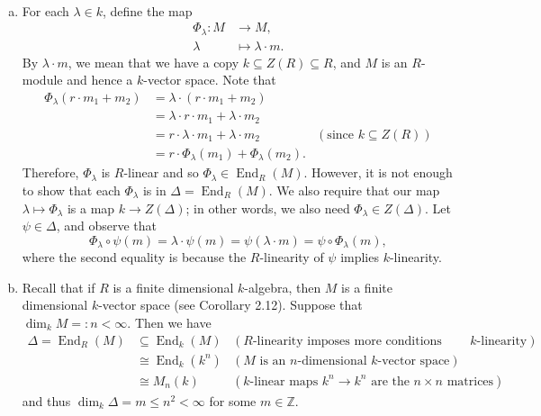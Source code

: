 \documentclass[10pt]{article}
\makeatletter
\numberwithin{equation}{section}
\newcommand{\Z}{\mathbb{Z}}
\DeclareMathOperator{\End}{End}
\theoremstyle{newstyle}
\newenvironment{pf}[1][\proofname]{\par
  \pushQED{\qed}%
  \normalfont \topsep0\p@\relax
  \trivlist
  \item[\hskip\labelsep\scshape
  #1\@addpunct{.}]\ignorespaces
}{%
  \popQED\endtrivlist\@endpefalse
}
\makeatother
\begin{document}
\begin{pf}~
\begin{enumerate}[(a)]
    \item For each $\lambda \in k$, define the map 
    \begin{align*}
        \Phi_\lambda : M &\to M, \\ \lambda &\mapsto \lambda \cdot m. 
    \end{align*}
    By $\lambda \cdot m$, we mean that we have a copy $k \subseteq Z(R) \subseteq R$, and $M$ 
    is an $R$-module and hence a $k$-vector space. Note that 
    \begin{align*}
        \Phi_\lambda(r \cdot m_1 + m_2) &= \lambda \cdot (r \cdot m_1 + m_2) \\
        &= \lambda \cdot r \cdot m_1 + \lambda \cdot m_2 \\
        &= r \cdot \lambda \cdot m_1 + \lambda \cdot m_2 & (\text{since $k \subseteq Z(R)$}) \\
        &= r \cdot \Phi_\lambda(m_1) + \Phi_\lambda(m_2).
    \end{align*}
    Therefore, $\Phi_\lambda$ is $R$-linear and so $\Phi_\lambda \in \End_R(M)$. However, it is not 
    enough to show that each $\Phi_\lambda$ is in $\Delta = \End_R(M)$. We also require that our map 
    $\lambda \mapsto \Phi_\lambda$ is a map $k \to Z(\Delta)$; in other words, we also need 
    $\Phi_\lambda \in Z(\Delta)$. Let $\psi \in \Delta$, and observe that 
    \[ \Phi_\lambda \circ \psi(m) = \lambda \cdot \psi(m) = \psi(\lambda \cdot m) = \psi \circ 
    \Phi_\lambda(m), \]
    where the second equality is because the $R$-linearity of $\psi$ implies $k$-linearity.
    
    \item Recall that if $R$ is a finite dimensional $k$-algebra, then $M$ is a finite dimensional 
    $k$-vector space (see Corollary 2.12). Suppose that $\dim_k M =: n < \infty$. Then we have 
    \begin{align*}
        \Delta = \End_R(M) &\subseteq \End_k(M) & (\text{$R$-linearity imposes more conditions than 
        $k$-linearity}) \\
        &\cong\End_k(k^n) & (\text{$M$ is an $n$-dimensional $k$-vector space}) \\
        &\cong M_n(k) & (\text{$k$-linear maps $k^n \to k^n$ are the $n \times n$ matrices})
    \end{align*}
    and thus $\dim_k \Delta = m \leq n^2 < \infty$ for some $m \in \Z$. 
    

\end{enumerate}
\end{pf}
\end{document}
